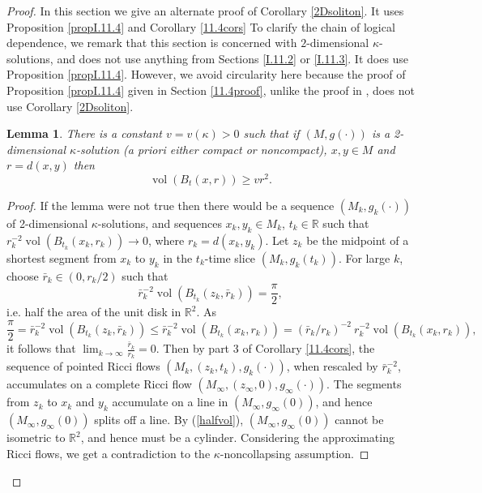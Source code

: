\documentclass[12pt]{amsart}
\newcommand{\R}{{\mathbb R}}
\newcommand{\vol}{\operatorname{vol}}
\newcommand{\ra}{\rightarrow}
\numberwithin{equation}{section}
\theoremstyle{plain}
\newtheorem{lemma}[equation]{Lemma}
\theoremstyle{definition}
\theoremstyle{remark}
\begin{document}
\begin{proof}
In this section we give an alternate proof of Corollary \ref{2Dsoliton}.
It uses Proposition \ref{propI.11.4} and Corollary \ref{11.4cors}
To clarify the chain of logical dependence, we remark that
this section is concerned with $2$-dimensional $\kappa$-solutions,
and does not use anything from Sections \ref{I.11.2} or \ref{I.11.3}.   It does use
Proposition \ref{propI.11.4}.  However, we avoid circularity here because the proof
of Proposition \ref{propI.11.4} given in Section \ref{11.4proof}, unlike the
proof in \cite{Perelman}, does not use Corollary \ref{2Dsoliton}.

\begin{lemma}
\label{2dvol}
There is a constant $v=v(\kappa)>0$ such that if
$(M,g(\cdot))$ is a 2-dimensional $\kappa$-solution
({\it a priori} either compact or noncompact), $x,y\in M$ and 
$r = d(x,y)$ then 
\begin{equation}
\label{volnotsmall}
\vol(B_t(x,r))\geq vr^2.
\end{equation}
\end{lemma}
\begin{proof}
If the lemma were not true then there would be a sequence $(M_k,g_k(\cdot))$
of 2-dimensional $\kappa$-solutions, and sequences $x_k,y_k\in M_k$, $t_k\in\R$
such that $r_k^{-2}\vol(B_{t_k}(x_k,r_k))\ra 0$, where
$r_k = d(x_k,y_k)$.  Let $z_k$ be the midpoint of a shortest segment
from $x_k$ to $y_k$ in the $t_k$-time slice $(M_k,g_k(t_k))$. For large $k$,
choose
$\bar r_k \in (0, r_k/2)$ such that 
\begin{equation}
\label{halfvol}
\bar r_k^{-2}\vol(B_{t_k}(z_k,\bar r_k))=\frac{\pi}{2},
\end{equation}
 i.e.
half the area of the  unit disk in $\R^2$.   
As
\begin{equation}
\frac{\pi}{2} = \bar r_k^{-2}\vol(B_{t_k}(z_k,\bar r_k)) \le
\bar r_k^{-2}\vol(B_{t_k}(x_k, r_k)) =
(\bar r_k / r_k)^{-2} \:  r_k^{-2} \vol(B_{t_k}(x_k, r_k)), 
\end{equation}
it follows that
$\lim_{k\ra\infty}\frac{\bar r_k}{ r_k}=0$.  
Then by part 3 of Corollary \ref{11.4cors},
the sequence of pointed Ricci flows $(M_k,(z_k,t_k),g_k(\cdot))$,
when rescaled by $\bar r_k^{-2}$, accumulates on a complete Ricci flow
$(M_\infty,(z_\infty,0),g_\infty(\cdot))$.  The segments from $z_k$
to $x_k$ and $y_k$ accumulate on a line in $(M_\infty,g_\infty(0))$,
and hence $(M_\infty,g_\infty(0))$ splits off a line.  By (\ref{halfvol}),
$(M_\infty,g_\infty(0))$ cannot be isometric to $\R^2$, and hence
must be a cylinder.  Considering the approximating
Ricci flows, we get a contradiction to the $\kappa$-noncollapsing assumption.
\end{proof}


\end{proof}
\end{document}
